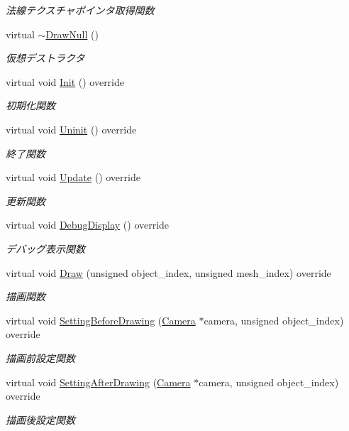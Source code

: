 \begin{DoxyCompactItemize}
\begin{DoxyCompactList}\small\item\em 法線テクスチャポインタ取得関数 \end{DoxyCompactList}\item 
virtual \mbox{\hyperlink{class_draw_null_af03c2d730ff3351baf234f89cc28303b}{$\sim$\+Draw\+Null}} ()
\begin{DoxyCompactList}\small\item\em 仮想デストラクタ \end{DoxyCompactList}\item 
virtual void \mbox{\hyperlink{class_draw_null_a20aef1e54c1a158b741bfd731e18efdf}{Init}} () override
\begin{DoxyCompactList}\small\item\em 初期化関数 \end{DoxyCompactList}\item 
virtual void \mbox{\hyperlink{class_draw_null_a6e81d63efab7333e8d0e8af99362a4d9}{Uninit}} () override
\begin{DoxyCompactList}\small\item\em 終了関数 \end{DoxyCompactList}\item 
virtual void \mbox{\hyperlink{class_draw_null_ad32a508d269de7eda8ad24ea72230464}{Update}} () override
\begin{DoxyCompactList}\small\item\em 更新関数 \end{DoxyCompactList}\item 
virtual void \mbox{\hyperlink{class_draw_null_aed3bbedfe8db8daf7cafa143750f2114}{Debug\+Display}} () override
\begin{DoxyCompactList}\small\item\em デバッグ表示関数 \end{DoxyCompactList}\item 
virtual void \mbox{\hyperlink{class_draw_null_a72ac0b7dc40b1469582419dcc5b0e114}{Draw}} (unsigned object\+\_\+index, unsigned mesh\+\_\+index) override
\begin{DoxyCompactList}\small\item\em 描画関数 \end{DoxyCompactList}\item 
virtual void \mbox{\hyperlink{class_draw_null_a3baf78b024837c8ebb2471e7505db6ea}{Setting\+Before\+Drawing}} (\mbox{\hyperlink{class_camera}{Camera}} $\ast$camera, unsigned object\+\_\+index) override
\begin{DoxyCompactList}\small\item\em 描画前設定関数 \end{DoxyCompactList}\item 
virtual void \mbox{\hyperlink{class_draw_null_a3600d14d2ce10f4281723567f97c08be}{Setting\+After\+Drawing}} (\mbox{\hyperlink{class_camera}{Camera}} $\ast$camera, unsigned object\+\_\+index) override
\begin{DoxyCompactList}\small\item\em 描画後設定関数 \end{DoxyCompactList}\end{DoxyCompactItemize}


